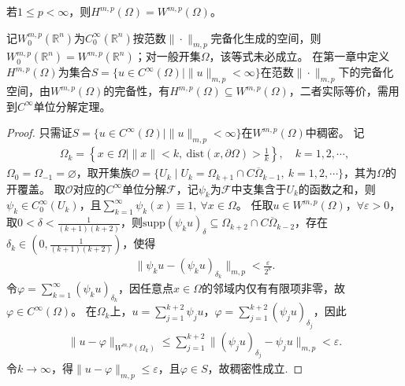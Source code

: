 \documentclass[../../main.tex]{subfiles}%
\begin{document}
\begin{theorem}
若$1\leqslant p<\infty$，则$H^{m,p}(\Omega)=W^{m,p}(\Omega)$。
\end{theorem}
\begin{remark}
记$W_{0}^{m,p}(\mathbb{R}^{n})$为$C_{0}^{\infty}(\mathbb{R}^{n})$按范数$\|\cdot\|_{m,p}$完备化生成的空间，则$W_{0}^{m,p}(\mathbb{R}^{n})=W^{m,p}(\mathbb{R}^{n})$；对一般开集$\Omega$，该等式未必成立。
在第一章中定义$H^{m,p}(\Omega)$为集合$S=\{u\in C^{\infty}(\Omega)\mid\|u\|_{m,p}<\infty\}$在范数$\|\cdot\|_{m,p}$下的完备化空间，由$W^{m,p}(\Omega)$的完备性，有$H^{m,p}(\Omega)\subseteq W^{m,p}(\Omega)$，二者实际等价，需用到$C^{\infty}$单位分解定理。
\end{remark}
\begin{proof}

只需证$S=\{u\in C^{\infty}(\Omega)\mid\|u\|_{m,p}<\infty\}$在$W^{m,p}(\Omega)$中稠密。
记
\begin{align*}
\Omega_{k}=\left\{x\in\Omega\mid\|x\|<k,\ \mathrm{dist}(x,\partial\Omega)>\frac{1}{k}\right\},\quad k=1,2,\cdots,
\end{align*}
$\Omega_{0}=\Omega_{-1}=\varnothing $，取开集族$\mathscr{O}=\{U_{k}\mid U_{k}=\Omega_{k+1}\cap C\overline{\Omega}_{k-1},\ k=1,2,\cdots\}$，其为$\Omega$的开覆盖。
取$\mathscr{O}$对应的$C^{\infty}$单位分解$\mathscr{F}$，记$\psi_{k}$为$\mathscr{F}$中支集含于$U_{k}$的函数之和，则$\psi_{k}\in C_{0}^{\infty}(U_{k})$，且$\sum\limits_{k=1}^{\infty}\psi_{k}(x)\equiv 1,\ \forall x\in\Omega$。
任取$u\in W^{m,p}(\Omega)$，$\forall\varepsilon>0$，取$0<\delta<\frac{1}{(k+1)(k+2)}$，则$\mathrm{supp}(\psi_{k}u)_{\delta}\subseteq\Omega_{k+2}\cap C\overline{\Omega}_{k-2}$，存在$\delta_{k}\in\left(0,\frac{1}{(k+1)(k+2)}\right)$，使得
\begin{align*}
\|\psi_{k}u-(\psi_{k}u)_{\delta_{k}}\|_{m,p}<\frac{\varepsilon}{2^{k}}.
\end{align*}
令$\varphi=\sum\limits_{k=1}^{\infty}(\psi_{k}u)_{\delta_{k}}$，因任意点$x\in\Omega$的邻域内仅有有限项非零，故$\varphi\in C^{\infty}(\Omega)$。
在$\Omega_{k}$上，$u=\sum\limits_{j=1}^{k+2}\psi_{j}u$，$\varphi=\sum\limits_{j=1}^{k+2}(\psi_{j}u)_{\delta_{j}}$，因此
\begin{align*}
\|u-\varphi\|_{W^{m,p}(\Omega_{k})}\leqslant\sum\limits_{j=1}^{k+2}\|(\psi_{j}u)_{\delta_{j}}-\psi_{j}u\|_{m,p}<\varepsilon.
\end{align*}
令$k\to\infty$，得$\|u-\varphi\|_{m,p}\leqslant\varepsilon$，且$\varphi\in S$，故稠密性成立.

\end{proof}
\end{document}

